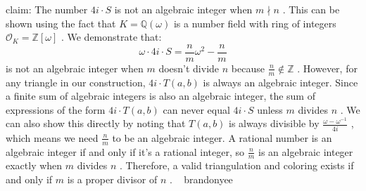 \documentclass[12pt]{article}
\begin{document}
claim: The number $4i \cdot S$ is not an algebraic integer when $m \nmid n$ . This can be shown using the fact that $K = \mathbb{Q}(\omega)$ is a number field with ring of integers $\mathcal{O}_K = \mathbb{Z}[\omega]$ . We demonstrate that: \[\omega \cdot 4i \cdot S = \frac{n}{m}\omega^2 - \frac{n}{m}\] is not an algebraic integer when $m$ doesn't divide $n$ because $\frac{n}{m} \not\in \mathbb{Z}$ . However, for any triangle in our construction, $4i \cdot T(a,b)$ is always an algebraic integer. Since a finite sum of algebraic integers is also an algebraic integer, the sum of expressions of the form $4i \cdot T(a,b)$ can never equal $4i \cdot S$ unless $m$ divides $n$ . We can also show this directly by noting that $T(a,b)$ is always divisible by $\frac{\omega - \omega^{-1}}{4i}$ , which means we need $\frac{n}{m}$ to be an algebraic integer. A rational number is an algebraic integer if and only if it's a rational integer, so $\frac{n}{m}$ is an algebraic integer exactly when $m$ divides $n$ . Therefore, a valid triangulation and coloring exists if and only if $m$ is a proper divisor of $n$ . ~ brandonyee
\end{document}
